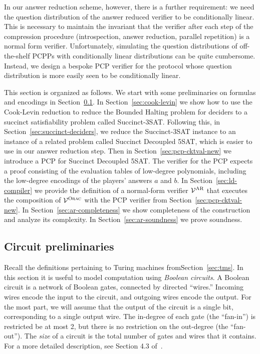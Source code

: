 \documentclass[11pt]{article}
\theoremstyle{definition}
\newcommand{\verifier}{\mathcal{V}}
\newcommand{\gamestyle}[1]{\ensuremath{\textsc{#1}}\xspace}
\newcommand{\ora}{\gamestyle{Orac}}
\newcommand{\ar}{\gamestyle{AR}}
\begin{document}
In our answer reduction scheme, however, there is a further requirement: we need
the question distribution of the answer reduced verifier to be conditionally
linear.
This is necessary to maintain the invariant that the verifier after each step of
the compression procedure (introspection, answer reduction, parallel repetition)
is a normal form verifier.
Unfortunately, simulating the question distributions of off-the-shelf PCPPs with
conditionally linear distributions can be quite cumbersome.
Instead, we design a bespoke PCP verifier for the protocol whose question
distribution is more easily seen to be conditionally linear.

This section is organized as follows.
We start with some preliminaries on formulas and encodings in
Section~\ref{sec:ar-tms}.
In Section~\ref{sec:cook-levin} we show how to use the Cook-Levin reduction to
reduce the Bounded Halting problem for deciders to a succinct satisfiability
problem called Succinct-3SAT.
Following this, in Section~\ref{sec:succinct-deciders}, we reduce the
Succinct-3SAT instance to an instance of a related problem called Succinct
Decoupled 5SAT, which is easier to use in our answer reduction step.
Then in Section~\ref{sec:pcp-cktval-new} we introduce a PCP for Succinct
Decoupled 5SAT.
The verifier for the PCP expects a proof consisting of the evaluation tables of
low-degree polynomials, including the low-degree encodings of the players'
answers $a$ and $b$.
In Section~\ref{sec:ld-compiler} we provide the definition of a normal-form
verifier $\verifier^\ar$ that executes the composition of $\verifier^\ora$ with
the PCP verifier from Section~\ref{sec:pcp-cktval-new}.
In Section~\ref{sec:ar-completeness} we show completeness of the construction
and analyze its complexity.
In Section~\ref{sec:ar-soundness} we prove soundness.

\subsection{Circuit preliminaries}
\label{sec:ar-tms}

Recall the definitions pertaining to Turing machines fromSection~\ref{sec:tms}. In this section it is useful to model
computation using \emph{Boolean circuits}. A Boolean circuit is
a network of Boolean gates, connected by directed ``wires.'' Incoming
wires encode the input to the circuit, and outgoing wires encode the
output. For the most part, we will assume that the output of the
circuit is a single bit, corresponding to a single output wire. The
in-degree of each gate (the ``fan-in'')
is restricted be at most 2, but there is no restriction on
the out-degree (the ``fan-out''). The \emph{size} of a circuit is the total
number of gates and wires that it contains. For a more detailed description, see Section 4.3 of~\cite{Pap94}.
\end{document}
